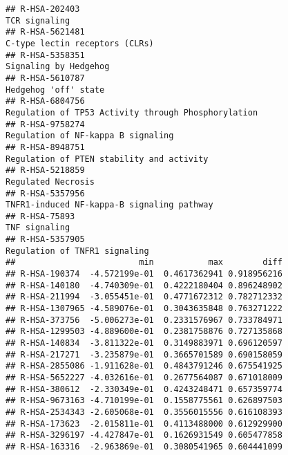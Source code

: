 \documentclass[
]{article}
\begin{document}
\begin{verbatim}
## R-HSA-202403                                                                                                                         TCR signaling
## R-HSA-5621481                                                                                                       C-type lectin receptors (CLRs)
## R-HSA-5358351                                                                                                                Signaling by Hedgehog
## R-HSA-5610787                                                                                                                 Hedgehog 'off' state
## R-HSA-6804756                                                                                  Regulation of TP53 Activity through Phosphorylation
## R-HSA-9758274                                                                                                   Regulation of NF-kappa B signaling
## R-HSA-8948751                                                                                            Regulation of PTEN stability and activity
## R-HSA-5218859                                                                                                                   Regulated Necrosis
## R-HSA-5357956                                                                                           TNFR1-induced NF-kappa-B signaling pathway
## R-HSA-75893                                                                                                                          TNF signaling
## R-HSA-5357905                                                                                                        Regulation of TNFR1 signaling
##                         min           max        diff
## R-HSA-190374  -4.572199e-01  0.4617362941 0.918956216
## R-HSA-140180  -4.740309e-01  0.4222180404 0.896248902
## R-HSA-211994  -3.055451e-01  0.4771672312 0.782712332
## R-HSA-1307965 -4.589076e-01  0.3043635848 0.763271222
## R-HSA-373756  -5.006273e-01  0.2331576967 0.733784971
## R-HSA-1299503 -4.889600e-01  0.2381758876 0.727135868
## R-HSA-140834  -3.811322e-01  0.3149883971 0.696120597
## R-HSA-217271  -3.235879e-01  0.3665701589 0.690158059
## R-HSA-2855086 -1.911628e-01  0.4843791246 0.675541925
## R-HSA-5652227 -4.032616e-01  0.2677564087 0.671018009
## R-HSA-380612  -2.330349e-01  0.4243248471 0.657359774
## R-HSA-9673163 -4.710199e-01  0.1558775561 0.626897503
## R-HSA-2534343 -2.605068e-01  0.3556015556 0.616108393
## R-HSA-173623  -2.015811e-01  0.4113488000 0.612929900
## R-HSA-3296197 -4.427847e-01  0.1626931549 0.605477858
## R-HSA-163316  -2.963869e-01  0.3080541965 0.604441099

\end{verbatim}
\end{document}
